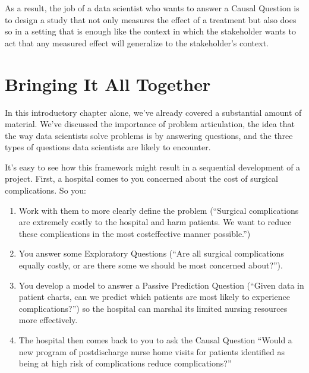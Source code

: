 \documentclass[letterpaper,10pt,english]{jupyterBook}
\begin{document}
\sphinxAtStartPar
As a result, the job of a data scientist who wants to answer a Causal Question is to design a study that not only measures the effect of a treatment but also does so in a setting that is enough like the context in which the stakeholder wants to act that any measured effect will generalize to the stakeholder’s context.


\section{Bringing It All Together}
\label{\detokenize{10_introduction/10_our_approach:bringing-it-all-together}}
\sphinxAtStartPar
In this introductory chapter alone, we’ve already covered a substantial amount of material. We’ve discussed the importance of problem articulation, the idea that the way data scientists solve problems is by answering questions, and the three types of questions data scientists are likely to encounter.

\sphinxAtStartPar
It’s easy to see how this framework might result in a sequential development of a project. First, a hospital comes to you concerned about the cost of surgical complications. So you:
\begin{enumerate}
%
\item {} 
\sphinxAtStartPar
Work with them to more clearly define the problem (“Surgical complications are extremely costly to the hospital and harm patients. We want to reduce these complications in the most cost\sphinxhyphen{}effective manner possible.”)

\item {} 
\sphinxAtStartPar
You answer some Exploratory Questions (“Are all surgical complications equally costly, or are there some we should be most concerned about?”).

\item {} 
\sphinxAtStartPar
You develop a model to answer a Passive Prediction Question (“Given data in patient charts, can we predict which patients are most likely to experience complications?”) so the hospital can marshal its limited nursing resources more effectively.

\item {} 
\sphinxAtStartPar
The hospital then comes back to you to ask the Causal Question “Would a new program of post\sphinxhyphen{}discharge nurse home visits for patients identified as being at high risk of complications reduce complications?”

\end{enumerate}
\end{document}
